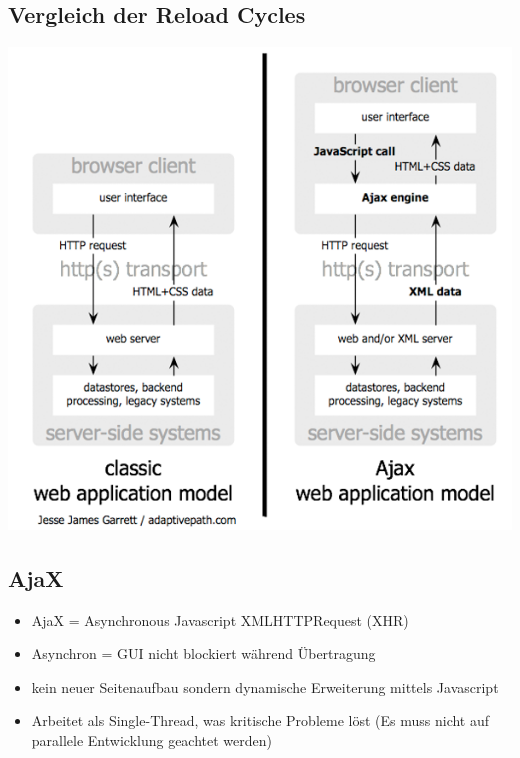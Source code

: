 \documentclass{article} %
\begin{document}
	\subsection{Vergleich der Reload Cycles}
	\begin{center}
		\includegraphics[scale=0.5]{img/HTTP_Ajax.png}
	\end{center}
	\subsection{AjaX}
	\begin{itemize}
		\item AjaX = Asynchronous Javascript XMLHTTPRequest (XHR)
		\item Asynchron = GUI nicht blockiert während Übertragung
		\item kein neuer Seitenaufbau sondern dynamische Erweiterung mittels Javascript
		\item Arbeitet als Single-Thread, was kritische Probleme löst (Es muss nicht auf parallele Entwicklung geachtet werden)
	\end{itemize}
\end{document}
